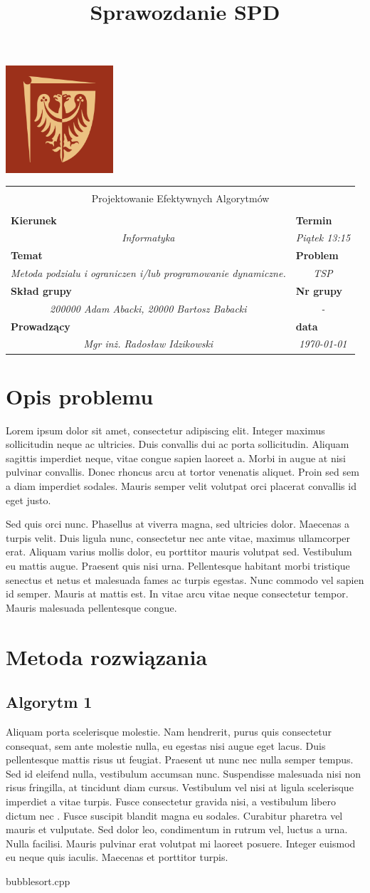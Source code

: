 \documentclass[polish,polish,a4paper]{article}
\title{Sprawozdanie SPD}
\newcommand{\name}[1]{\sffamily\bfseries\scriptsize #1}
\newcommand{\frontpage}[8]{

\hfill\includegraphics[width=4cm]{PWr.png}
\vspace{2cm}

\begin{tabular}{|p{0.72\textwidth}|p{0.28\textwidth}|}
\hline
\multicolumn{2}{|c|}{}\\
\multicolumn{2}{|c|}{{\LARGE #1}}\\
\multicolumn{2}{|c|}{}\\
\hline
\name{Kierunek} & \name{Termin}\\
\multicolumn{1}{|c|}{\textit{#2}} & \multicolumn{1}{|c|}{\textit{#3}} \\
\hline
\name{Temat} & \name{Problem}\\
\multicolumn{1}{|c|}{\textit{#4}} & \multicolumn{1}{|c|}{\textit{#5}} \\
\hline
\name{Skład grupy} & \name{Nr grupy}\\
\multicolumn{1}{|c|}{\textit{#6}} & \multicolumn{1}{|c|}{\textit{#7}} \\
\hline
\name{Prowadzący} & \name{data}\\
\multicolumn{1}{|c|}{\textit{Mgr inż. Radosław Idzikowski}} & \multicolumn{1}{|c|}{\textit{#8}} \\
\hline
\end{tabular}

}
\begin{document}
\frontpage{Projektowanie Efektywnych Algorytmów}{Informatyka}{Piątek 13:15}{Metoda podzialu i ograniczen i/lub programowanie dynamiczne.}{TSP}{200000 Adam Abacki,  20000 Bartosz Babacki}{-}{\today}
\pagestyle{empty}
\newpage
\section{Opis problemu}
Lorem ipsum dolor sit amet, consectetur adipiscing elit. Integer maximus sollicitudin neque ac ultricies. Duis convallis dui ac porta sollicitudin. Aliquam sagittis imperdiet neque, vitae congue sapien laoreet a\cite{Smut2012}. Morbi in augue at nisi pulvinar convallis. Donec rhoncus arcu at tortor venenatis aliquet. Proin sed sem a diam imperdiet sodales. Mauris semper velit volutpat orci placerat convallis id eget justo.

Sed quis orci nunc. Phasellus at viverra magna, sed ultricies dolor. Maecenas a turpis velit. Duis ligula nunc, consectetur nec ante vitae, maximus ullamcorper erat. Aliquam varius mollis dolor, eu porttitor mauris volutpat sed. Vestibulum eu mattis augue. Praesent quis nisi urna. Pellentesque habitant morbi tristique senectus et netus et malesuada fames ac turpis egestas. Nunc commodo vel sapien id semper. Mauris at mattis est. In vitae arcu vitae neque consectetur tempor. Mauris malesuada pellentesque congue.
\section{Metoda rozwiązania}
\subsection{Algorytm 1}
Aliquam porta scelerisque molestie. Nam hendrerit, purus quis consectetur consequat, sem ante molestie nulla, eu egestas nisi augue eget lacus. Duis pellentesque mattis risus ut feugiat. Praesent ut nunc nec nulla semper tempus. Sed id eleifend nulla, vestibulum accumsan nunc. Suspendisse malesuada nisi non risus fringilla, at tincidunt diam cursus. Vestibulum vel nisi at ligula scelerisque imperdiet a vitae turpis. Fusce consectetur gravida nisi, a vestibulum libero dictum nec . Fusce suscipit blandit magna eu sodales. Curabitur pharetra vel mauris et vulputate. Sed dolor leo, condimentum in rutrum vel, luctus a urna. Nulla facilisi. Mauris pulvinar erat volutpat mi laoreet posuere. Integer euismod eu neque quis iaculis. Maecenas et porttitor turpis.

{bubblesort.cpp}
\end{document}
